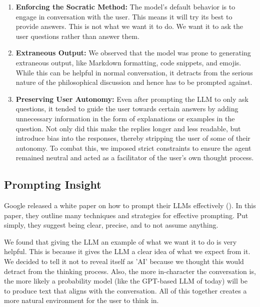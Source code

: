 \documentclass[letterpaper,11pt,leqno]{article}
\begin{document}
\begin{enumerate}[label=\textbf{\arabic*.}]
  \item \textbf{Enforcing the Socratic Method: } The model's default behavior is to engage in conversation with the user. This means it will try its best to provide answers. This is not what we want it to do. We want it to ask the user questions rather than answer them.

  \item \textbf{Extraneous Output: } We observed that the model was prone to generating extraneous output, like Markdown formatting, code snippets, and emojis. While this can be helpful in normal conversation, it detracts from the serious nature of the philosophical discussion and hence has to be prompted against.

  \item \textbf{Preserving User Autonomy: } Even after prompting the LLM to only ask questions, it tended to guide the user towards certain answers by adding unnecessary information in the form of explanations or examples in the question. Not only did this make the replies longer and less readable, but introduce bias into the responses, thereby stripping the user of some of their autonomy. To combat this, we imposed strict constraints to ensure the agent remained neutral and acted as a facilitator of the user's own thought process.
\end{enumerate}

\subsection{Prompting Insight}

Google released a white paper on how to prompt their LLMs effectively (\cite{PromptEngineering}). In this paper, they outline many techniques and strategies for effective prompting. Put simply, they suggest being clear, precise, and to not assume anything. 

We found that giving the LLM an example of what we want it to do is very helpful. This is because it gives the LLM a clear idea of what we expect from it. We decided to tell it not to reveal itself as 'AI' because we thought this would detract from the thinking process. Also, the more in-character the conversation is, the more likely a probability model (like the GPT-based LLM of today) will be to produce text that aligns with the conversation. All of this together creates a more natural environment for the user to think in.
\end{document}
